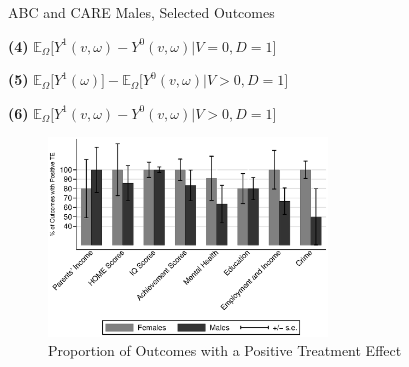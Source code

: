 \documentclass[static]{JJH-Beamer}
\newcommand*\leftright[2]{%
  \leavevmode
  \rlap{#1}%
  \hspace{0.5\linewidth}%
  #2}
\begin{document}

\begin{frame} \label{resultsmales}
\begin{table}
	\caption{ABC and CARE Males, Selected Outcomes}
	\scalebox{0.7}{}
\end{table}
\begin{tiny}
\leftright{\textbf{(1)} $\mathbb{E}_\Omega \big[ Y^1(\omega) - Y^0(\omega) | D = 1\big]$}{\textbf{(4)} $\mathbb{E}_\Omega \big[ Y^1(v, \omega) - Y^0(v, \omega) | V=0, D = 1 \big] $} \par
\leftright{\textbf{(2)} $\mathbb{E}_\Omega \big[ Y^1(\omega) - Y^0(\omega) |  X, D = 1 \big]$}{\textbf{(5)} $\mathbb{E}_\Omega \big[ Y^1(\omega) \big] - \mathbb{E}_\Omega \big[ Y^0(v, \omega) | V > 0, D =1 \big]$} \par
\leftright{\textbf{(3)} $\mathbb{E}_\Omega \big[ Y^1(\omega) \big] - \mathbb{E}_\Omega \big[ Y^0(v, \omega) | V =0, D =1 \big]$}{\textbf{(6)} $\mathbb{E}_\Omega \big[ Y^1(v, \omega) - Y^0(v, \omega) | V > 0 , D = 1\big]$}

\end{tiny}
\hyperlink{stepdownmales}{}
\hyperlink{roymales}{}
\end{frame}


\begin{frame}
\begin{figure}
\caption{Proportion of Outcomes with a Positive Treatment Effect}
	\includegraphics[width=20em]{output/itt_noctrl_cats1.eps}
\end{figure}
\end{frame}

\end{document}
